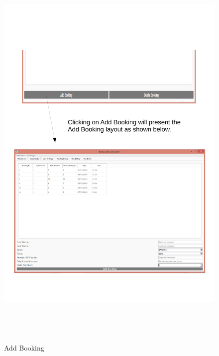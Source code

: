 \begin{figure}[H]
    \includegraphics[height = 20cm]{./Testing/images/test2.pdf}
    \caption{Add Booking} \label{fig:Test2}
\end{figure}

